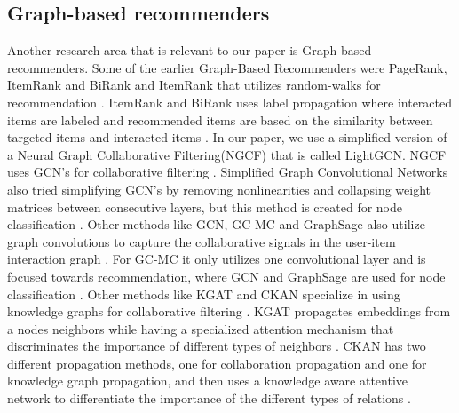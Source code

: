 \subsection{Graph-based recommenders}
Another research area that is relevant to our paper is Graph-based recommenders.
Some of the earlier Graph-Based Recommenders were PageRank, ItemRank and BiRank and ItemRank that utilizes random-walks for recommendation \cite{PageRank,BiRank,ItemRank}.
ItemRank and BiRank uses label propagation where interacted items are labeled and recommended items are based on the similarity between targeted items and interacted items \cite{BiRank,ItemRank}.
In our paper, we use a simplified version of a Neural Graph Collaborative Filtering(NGCF) that is called LightGCN.
NGCF uses GCN's for collaborative filtering \cite{lightgcn, NGCF}.
Simplified Graph Convolutional Networks also tried simplifying GCN's by removing nonlinearities and collapsing weight matrices between consecutive layers, but this method is created for node classification \cite{lightgcn, SGCN}.
Other methods like GCN, GC-MC and GraphSage also utilize graph convolutions to capture the collaborative signals in the user-item interaction graph \cite{GCN,GC-MC, GraphSage}.
For GC-MC it only utilizes one convolutional layer and is focused towards recommendation\cite{GC-MC}, where GCN and GraphSage are used for node classification \cite{GCN,GraphSage}.
Other methods like KGAT and CKAN specialize in using knowledge graphs for collaborative filtering \cite{KGAT, CKAN}.
KGAT propagates embeddings from a nodes neighbors while having a specialized attention mechanism that discriminates the importance of different types of neighbors \cite{KGAT}.
CKAN has two different propagation methods, one for collaboration propagation and one for knowledge graph propagation, and then uses a knowledge aware attentive network to differentiate the importance of the different types of relations \cite{CKAN}.


